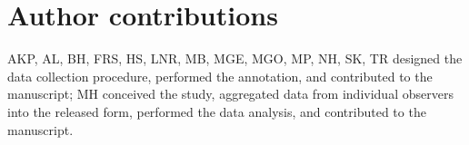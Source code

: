 \section*{Author contributions}
AKP, AL, BH, FRS, HS, LNR, MB, MGE, MGO, MP, NH, SK, TR designed the data collection procedure,
performed the annotation, and contributed to the manuscript;
MH conceived the study, aggregated data from individual observers into the released form, performed the data analysis, and contributed to the manuscript.
